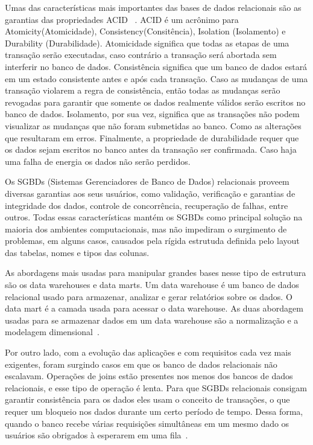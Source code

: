 Umas das características mais importantes das bases de dados relacionais são as garantias das propriedades ACID  ~\cite{Orendanalysisand}. ACID é um acrônimo para Atomicity(Atomicidade), Consistency(Consitência), Isolation (Isolamento) e Durability (Durabilidade).
Atomicidade significa que todas as etapas de uma transação serão executadas, caso contrário a transação será abortada sem interferir no banco de dados. Consistência significa que um banco de dados estará em um estado consistente antes e após cada transação. Caso as mudanças de uma transação violarem a regra de consistência, então todas as mudanças serão revogadas para garantir que somente os dados realmente válidos serão escritos no banco de dados. Isolamento, por sua vez, significa que as transações não podem visualizar as mudanças que não foram submetidas ao banco. Como as alterações que resultaram em erros. Finalmente, a propriedade de durabilidade requer que os dados sejam escritos no banco antes da transação ser confirmada. Caso haja uma falha de energia os dados não serão perdidos.

Os SGBDs (Sistemas Gerenciadores de Banco de Dados) relacionais proveem diversas garantias aos seus usuários, como validação, verificação e garantias de integridade dos dados, controle de concorrência, recuperação de falhas,  entre outros. Todas essas características mantém os SGBDs como principal solução na maioria dos ambientes computacionais, mas não impediram o surgimento de problemas, em alguns casos, causados pela rígida estrutuda definida pelo layout das tabelas, nomes e tipos das colunas.

As abordagens mais usadas para manipular grandes bases nesse tipo de estrutura são os data warehouses e data marts. Um data warehouse é um banco de dados relacional usado para armazenar, analizar e gerar relatórios sobre os dados. O data mart é a camada usada para acessar o data warehouse. As duas abordagem usadas para se armazenar dados em um data warehouse são a normalização e a modelagem dimensional~\cite{bigdataarchitectureandapproach}.

Por outro lado, com a evolução das aplicações e com requisitos cada vez mais exigentes, foram surgindo casos em que os banco de dados relacionais não escalavam. Operações de joins estão presentes nos menos dos bancos de dados relacionais, e esse tipo de operação é lenta. Para que SGBDs relacionais consigam garantir consistência para os dados eles usam o conceito de transações, o que requer um bloqueio nos dados durante um certo período de tempo.  Dessa forma, quando o banco recebe várias requisições simultâneas em um mesmo dado os usuários são obrigados à esperarem em uma fila~\cite{cassandraguide}.

